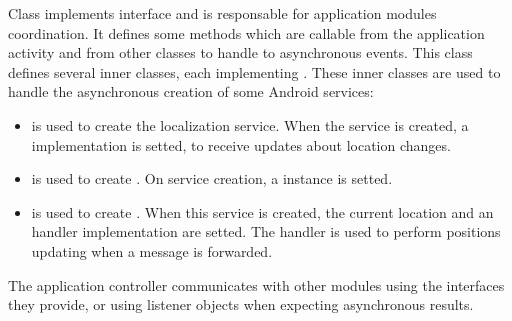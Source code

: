 Class  implements  interface and is responsable for application modules coordination. It defines some methods which are callable from the application activity and from other classes to handle to asynchronous events. This class defines several inner classes, each implementing . These inner classes are used to handle the asynchronous creation of some Android services:
	\begin{itemize}
		\item {} is used to create the localization service. When the service is created, a  implementation is setted, to receive updates about location changes.  
		\item {} is used to create . On service creation, a  instance is setted.
		\item {} is used to create . When this service is created, the current location and an handler implementation are setted. The handler is used to perform positions updating when a message is forwarded.
	\end{itemize}  
	
The application controller communicates with other modules using the interfaces they provide, or using listener objects when expecting asynchronous results.
